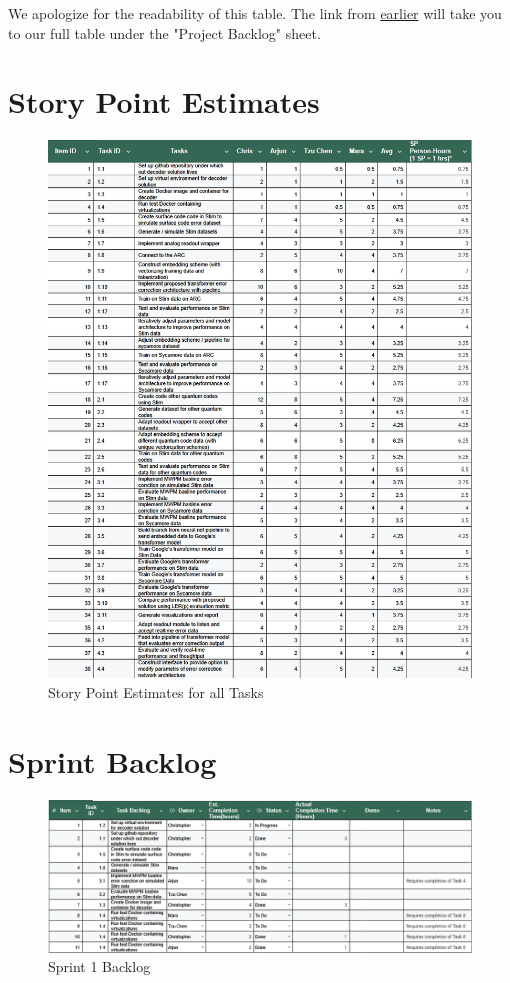\documentclass[12pt]{article}
\begin{document}
We apologize for the readability of this table. The link from \hyperref[link]{earlier} will take you to our full table under the "Project Backlog" sheet.

\section{Story Point Estimates}

\begin{figure}[H]
        \centering
        \includegraphics[width=0.9\linewidth]{images/story_point_estimates.png}
        \caption{Story Point Estimates for all Tasks}
        \label{fig:2}
\end{figure}

\section{Sprint Backlog}

\begin{figure}[H]
        \centering
        \includegraphics[width=1\linewidth]{images/sprint1_backlog.png}
        \caption{Sprint 1 Backlog}
        \label{fig:3}
\end{figure}
\end{document}
